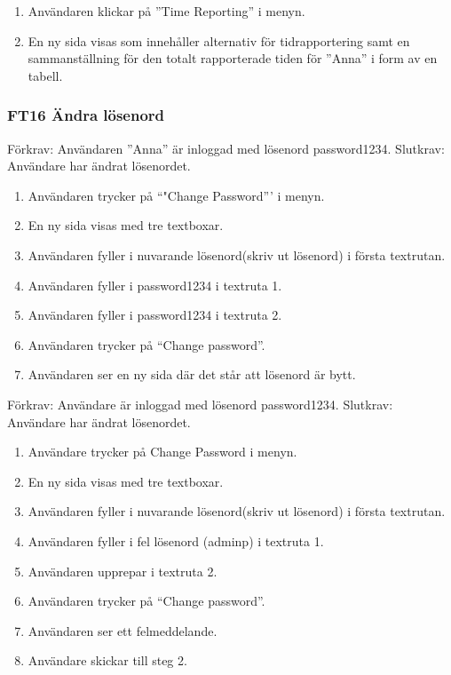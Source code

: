 \documentclass[paper=a4, fontsize=11pt,twoside]{article}
\begin{document}
		\begin{enumerate}
		  \item Användaren klickar på ”Time Reporting” i menyn. 
		  \item En ny sida visas som innehåller alternativ för tidrapportering samt en
		  sammanställning för den totalt rapporterade tiden för ”Anna” i form av en
		  tabell.
		  
		\end{enumerate}
		
		\subsubsection*{FT16 Ändra lösenord}
		
		Förkrav: Användaren ”Anna” är inloggad med lösenord password1234.
		\newline 
		Slutkrav: Användare har ändrat lösenordet.
		
		\begin{enumerate}
		  	\item Användaren trycker på ``"Change Password''' i menyn.
			\item En ny sida visas med tre textboxar.
			\item Användaren fyller i nuvarande lösenord(skriv ut lösenord) i första
			textrutan.
			\item Användaren fyller i password1234 i textruta 1.
			\item Användaren fyller i password1234 i textruta 2. 
			\item Användaren trycker på “Change password”.
			\item Användaren ser en ny sida där det står att lösenord är bytt.
		  
		\end{enumerate}
		
		
		
		Förkrav: Användare är inloggad med lösenord password1234.
		\newline 
		Slutkrav: Användare har ändrat lösenordet.
		
		\begin{enumerate}
		\item Användare trycker på Change Password i menyn.
		\item	En ny sida visas med tre textboxar.
		\item	Användaren fyller i nuvarande lösenord(skriv ut lösenord) i första
		textrutan.
		\item Användaren fyller i fel lösenord (adminp) i textruta 1.
		\item	Användaren upprepar i textruta 2.
		\item	Användaren trycker på “Change password”.
		\item	Användaren ser ett felmeddelande.
		\item	Användare skickar till steg 2.
		  
		\end{enumerate}
		
\end{document}
